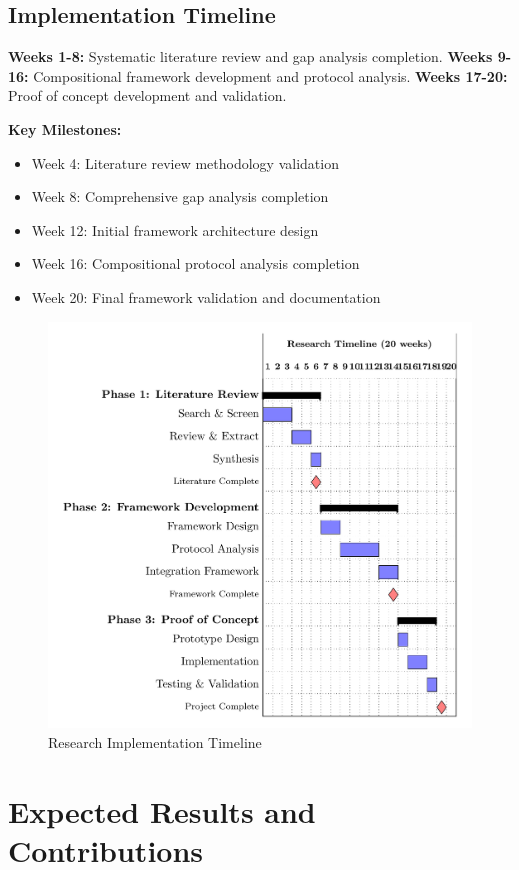 \documentclass[12pt,a4paper]{article}
\begin{document}
\subsection{Implementation Timeline}

\textbf{Weeks 1-8:} Systematic literature review and gap analysis completion.
\textbf{Weeks 9-16:} Compositional framework development and protocol analysis.
\textbf{Weeks 17-20:} Proof of concept development and validation.

\textbf{Key Milestones:}
\begin{itemize}
\item Week 4: Literature review methodology validation
\item Week 8: Comprehensive gap analysis completion
\item Week 12: Initial framework architecture design
\item Week 16: Compositional protocol analysis completion
\item Week 20: Final framework validation and documentation
\end{itemize}

\begin{figure}[h!]
    \centering
    \includegraphics[width=.8\linewidth]{timeline-gantt-simple-1.png}
    \caption{Research Implementation Timeline}
    \label{fig:timeline}
\end{figure}

\section{Expected Results and Contributions}
\label{sec:results}
\end{document}
